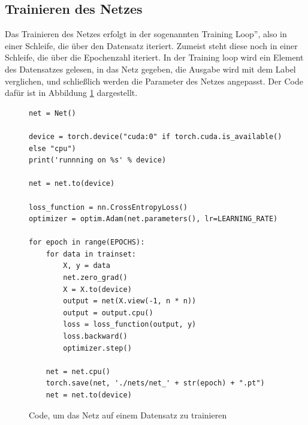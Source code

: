 \documentclass[11pt]{article}
\begin{document}
\subsection{Trainieren des Netzes}
Das Trainieren des Netzes erfolgt in der sogenannten \glqq Training Loop'', also in einer Schleife, die über den Datensatz iteriert. Zumeist steht diese noch in einer Schleife, die über die Epochenzahl iteriert. In der Training loop wird ein Element des Datensatzes gelesen, in das Netz gegeben, die Ausgabe wird mit dem Label verglichen, und schließlich werden die Parameter des Netzes angepasst. Der Code dafür ist in Abbildung \ref{Code_train_loop} dargestellt.
 \begin{figure}[h]
 	\begin{verbatim}
net = Net()

device = torch.device("cuda:0" if torch.cuda.is_available() else "cpu")
print('runnning on %s' % device)

net = net.to(device)

loss_function = nn.CrossEntropyLoss()
optimizer = optim.Adam(net.parameters(), lr=LEARNING_RATE)

for epoch in range(EPOCHS):
	for data in trainset:
		X, y = data
		net.zero_grad() 
		X = X.to(device)
		output = net(X.view(-1, n * n))
		output = output.cpu()
		loss = loss_function(output, y)  
		loss.backward() 
		optimizer.step()  
		
	net = net.cpu()
	torch.save(net, './nets/net_' + str(epoch) + ".pt")
	net = net.to(device)

 	\end{verbatim}
 	\caption{Code, um das Netz auf einem Datensatz zu trainieren}
 	\label{Code_train_loop}
 \end{figure}\\
\end{document}
